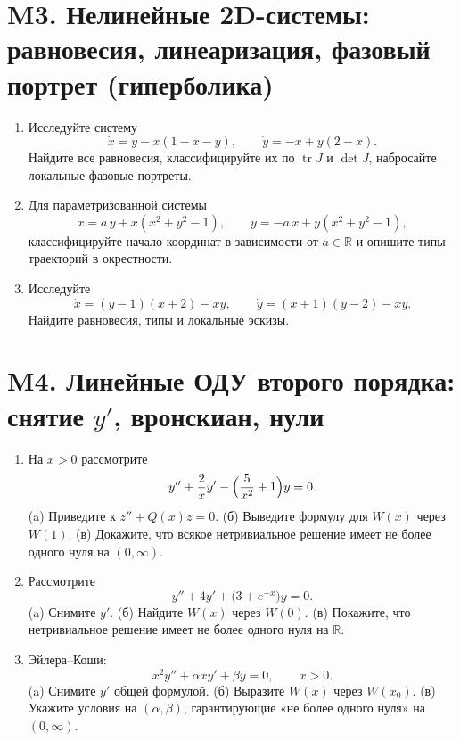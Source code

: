 \documentclass[12pt]{article}
\begin{document}
\section{M3. Нелинейные 2D-системы: равновесия, линеаризация, фазовый портрет (гиперболика)}
\begin{enumerate}
\item Исследуйте систему
\[
\dot x = y - x(1-x-y),\qquad
\dot y = -x + y(2-x).
\]
Найдите все равновесия, классифицируйте их по $\operatorname{tr}J$ и $\det J$, набросайте локальные фазовые портреты.

\item Для параметризованной системы
\[
\dot x = a\,y + x(x^2+y^2-1),\qquad
\dot y = -a\,x + y(x^2+y^2-1),
\]
классифицируйте начало координат в зависимости от $a\in\mathbb{R}$ и опишите типы траекторий в окрестности.

\item Исследуйте
\[
\dot x = (y-1)(x+2)-xy,\qquad
\dot y = (x+1)(y-2)-xy.
\]
Найдите равновесия, типы и локальные эскизы.
\end{enumerate}

\section{M4. Линейные ОДУ второго порядка: снятие $y'$, вронскиан, нули}
\begin{enumerate}
\item На $x>0$ рассмотрите
\[
y''+\frac{2}{x}y' -\Bigl(\frac{5}{x^2}+1\Bigr)y=0.
\]
(a) Приведите к $z''+Q(x)z=0$. (б) Выведите формулу для $W(x)$ через $W(1)$. (в) Докажите, что всякое нетривиальное решение имеет не более одного нуля на $(0,\infty)$.

\item Рассмотрите
\[
y''+4y'+\bigl(3+e^{-x}\bigr)y=0.
\]
(a) Снимите $y'$. (б) Найдите $W(x)$ через $W(0)$. (в) Покажите, что нетривиальное решение имеет не более одного нуля на $\mathbb{R}$.

\item Эйлера--Коши:
\[
x^2y''+\alpha x y'+\beta y=0,\qquad x>0.
\]
(a) Снимите $y'$ общей формулой. (б) Выразите $W(x)$ через $W(x_0)$. (в) Укажите условия на $(\alpha,\beta)$, гарантирующие «не более одного нуля» на $(0,\infty)$.
\end{enumerate}

\end{document}
